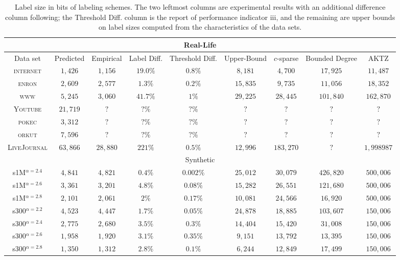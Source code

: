 \begin{table}
\small
\begin{tabular}{ccccccccc}
\hline \multicolumn{9}{c}{Real-Life}\\\hline
Data set&Predicted &Empirical & Label Diff. & Threshold Diff.   & Upper-Bound     &$c$-sparse &Bounded Degree \cite{adjiashvili2014labeling} &AKTZ \cite{alstrup2014adjacency}\\\hline
\textsc{internet}   &$1,426$    &$1,156$  & $19.0\%$  & $0.8\%$  & $8,181 $  &$4,700$      &$17,925$  &$11,487$\\
\textsc{enron}      &$2,609$    &$2,577$  & $1.3\%$ & $0.2\%$   & $15,835 $ &$9,735$      &$11,056$  &$18,352$\\
\textsc{www}        &$5,245$    &$3,060$  & $41.7\%$  & $1\%$  & $29,225 $ &$28,445$     &$101,840$ &$162,870$ \\
\textsc{Youtube}        &$21,719$    &$?$  & $?\%$  & $?\%$  & $? $ &$?$     &$?$ &$?$ \\
\textsc{pokec}        &$3,312$    &$?$  & $?\%$  & $?\%$  & $? $ &$?$     &$?$ &$?$ \\
\textsc{orkut}        &$7,596$    &$?$  & $?\%$  & $?\%$  & $? $ &$?$     &$?$ &$?$ \\
\textsc{LiveJournal}        &$63,866$    &$28,880$  & $221\%$  & $0.5\%$  & $12,996 $ &$183,270$     &$?$ &$1,998987$ \\\hline
\multicolumn{9}{c}{Synthetic}\\\hline
s1M$^{\alpha=2.4}$  &$4,841$    &$4,821$  & $0.4\%$ & $0.002\%$  & $25,012 $ &$30,079$     &$426,820$ &$500,006$\\
s1M$^{\alpha=2.6}$  &$3,361$    &$3,201$   & $4.8\%$ & $0.08\%$  & $15,282 $ &$26,551$     &$121,680$ &$500,006$\\
s1M$^{\alpha=2.8}$  &$2,101$    &$2,061$    & $2\%$ & $0.17\%$  & $10,081 $ &$24,566$     &$16,920$  &$500,006$\\
s300$^{\alpha=2.2}$ &$4,523$    &$4,447$  & $1.7\%$ & $0.05\%$  & $24,878 $ &$18,885$     &$103,607$ &$150,006$\\
s300$^{\alpha=2.4}$ &$2,775$    &$2,680$   & $3.5\%$  & $0.3\%$ & $14,404 $ &$15,420$     &$31,008$  &$150,006$\\
s300$^{\alpha=2.6}$ &$1,958$    &$1,920$  & $3.1\%$ & $0.35\%$   & $9,151 $  &$13,792$     &$13,395$  &$150,006$\\
s300$^{\alpha=2.8}$ &$1,350$    &$1,312$  & $2.8\%$ & $0.1\%$   & $6,244 $  &$12,849$     &$17,499$  &$150,006$\\\hline
\end{tabular}
\caption{Label size in bits of labeling schemes. The two leftmost columns are experimental results with an additional difference column following; the Threshold Diff. column is the report of performance indicator iii, and the remaining are upper bounds on label sizes computed from the characteristics of the data sets.}
\label{t:labelsizes}
\end{table}

